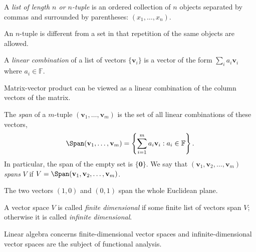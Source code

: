 
\begin{defn}
  A \emph{list of length $n$ or $n$-tuple}
   is an ordered collection
   of $n$ objects separated by commas and surrounded by parentheses:
   $(x_1, \ldots, x_n)$.
\end{defn}

\begin{rem}
  An $n$-tuple is different from a set in that repetition
  of the same objects are allowed.
\end{rem}

\begin{defn}
  A \emph{linear combination} of a list
   of vectors $\{\mathbf{v}_i\}$ is a vector of the form
   $\sum_ia_i\mathbf{v}_i$ where $a_i\in \mathbb{F}$.
\end{defn}

\begin{exm}
  Matrix-vector product can be viewed as a linear combination
   of the column vectors of the matrix.
\end{exm}

\begin{defn}
  \label{def:span}
  The \emph{span} of a $m$-tuple $(\mathbf{v}_1,\ldots,\mathbf{v}_m)$
   is the set of all linear combinations of these vectors,
   \begin{equation}
     \label{eq:span}
     \Span(\mathbf{v}_1, \ldots, \mathbf{v}_m)
     = \left\{\sum_{i=1}^m a_i\mathbf{v}_i : a_i\in \mathbb{F}\right\}.
   \end{equation}
  In particular, the span of the empty set is $\{\mathbf{0}\}$.
   We say that $(\mathbf{v}_1, \mathbf{v}_2, \ldots, \mathbf{v}_m)$
   \emph{spans} $V$
   if $V=\Span(\mathbf{v}_1, \mathbf{v}_2, \ldots, \mathbf{v}_m)$.
\end{defn}

\begin{exm}
  The two vectors $(1,0)$ and $(0,1)$ span
  the whole Euclidean plane.
\end{exm}

\begin{defn}
  A vector space $V$ is called \emph{finite dimensional}
   if some finite list of vectors span $V$;
   otherwise it is called \emph{infinite dimensional}.
\end{defn}

\begin{rem}
Linear algebra concerns finite-dimensional vector spaces
 and infinite-dimensional vector spaces
 are the subject of functional analysis.
\end{rem}

